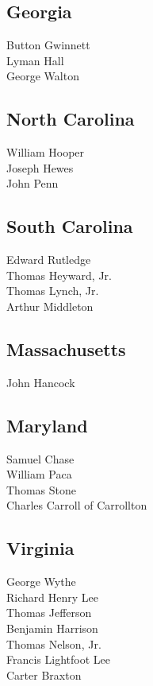 \documentclass[a4paper,landscape,10pt]{article}
\begin{document}
\begin{multicols}{7}
	
\subsection*{Georgia}

Button Gwinnett\\
Lyman Hall\\
George Walton

\subsection*{North Carolina}

William Hooper\\
Joseph Hewes\\
John Penn

\subsection*{South Carolina}

Edward Rutledge\\
Thomas Heyward, Jr.\\
Thomas Lynch, Jr.\\
Arthur Middleton

\subsection*{Massachusetts}

John Hancock

\subsection*{Maryland}

Samuel Chase\\
William Paca\\
Thomas Stone\\
Charles Carroll of Carrollton

\subsection*{Virginia}

George Wythe\\
Richard Henry Lee\\
Thomas Jefferson\\
Benjamin Harrison\\
Thomas Nelson, Jr.\\
Francis Lightfoot Lee\\
Carter Braxton


\end{multicols}
\end{document}
